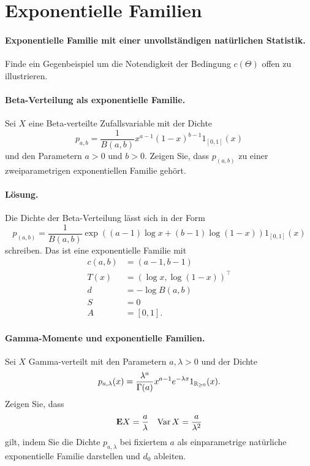 \section{Exponentielle Familien}


\paragraph{Exponentielle Familie mit einer unvollständigen natürlichen Statistik.}
Finde ein Gegenbeispiel um die Notendigkeit der Bedingung $c(\Theta)$ offen zu
illustrieren. 


\paragraph{Beta-Verteilung als exponentielle Familie.}
Sei $X$ eine Beta-verteilte Zufallsvariable mit der Dichte
\begin{equation*}
    p_{a,b} = \frac{1}{B(a,b)} x^{a-1} (1-x)^{b-1} 1_{[0,1]}(x)
\end{equation*}
und den Parametern $a>0$ und $b>0$.
Zeigen Sie, dass $p_{(a,b)}$ zu einer zweiparametrigen exponentiellen
Familie gehört.

\paragraph*{Lösung.} Die Dichte der Beta-Verteilung lässt sich in der Form
\begin{equation*}
    p_{(a,b)} = \frac{1}{B(a,b)} \exp \left( 
        (a-1) \log x + (b-1) \log (1-x) 
        \right) 1_{[0,1]}(x)
\end{equation*}
schreiben. Das ist eine exponentielle Familie mit 
\begin{align*}
    c(a,b) &= \left( a-1, b-1 \right) \\
    T(x) &= \left( \log x, \log (1-x) \right)^\top \\
    d &= - \log B(a,b) \\
    S &= 0 \\
    A &= [0,1].
\end{align*}


\paragraph{Gamma-Momente und exponentielle Familien.}
Sei $X$ Gamma-verteilt mit den Parametern $a,\lambda>0$ und der Dichte
\begin{equation*}
    p_{a,\lambda} (x) = \frac{\lambda^a}{\Gamma(a)} x^{a-1} e^{-\lambda x} 1_{\mathbb R_{\geq 0}} (x).
\end{equation*}
Zeigen Sie, dass 
\begin{align*}
    \mathbf{E} X = \frac{a}{\lambda} && \operatorname{Var} X = \frac{a}{\lambda^2} 
\end{align*}
gilt, indem Sie die Dichte $p_{a,\lambda}$ bei fixiertem $a$ als einparametrige
natürliche exponentielle Familie darstellen und $d_0$ ableiten. 


